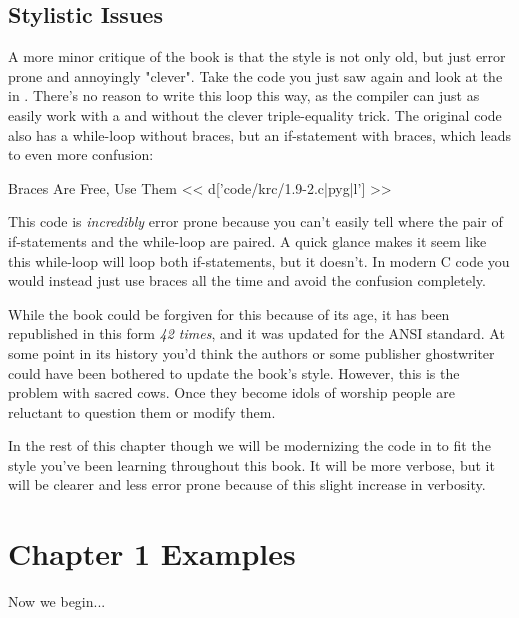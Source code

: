 \subsection{Stylistic Issues}

A more minor critique of the book is that the style is not only old, but just
error prone and annoyingly "clever".  Take the code you just saw again and look
at the  in .  There's no reason to write this
loop this way, as the compiler can just as easily work with a 
and without the clever triple-equality trick.  The original code also
has a while-loop without braces, but an if-statement with braces, which
leads to even more confusion:

\begin{code}{Braces Are Free, Use Them}
<< d['code/krc/1.9-2.c|pyg|l'] >>
\end{code}

This code is \emph{incredibly} error prone because you can't easily tell
where the pair of if-statements and the while-loop are paired.  A quick
glance makes it seem like this while-loop will loop both if-statements,
but it doesn't.  In modern C code you would instead just use braces all
the time and avoid the confusion completely.

While the book could be forgiven for this because of its age, it has been
republished in this form \emph{42 times}, and it was updated for the ANSI
standard.  At some point in its history you'd think the authors or some
publisher ghostwriter could have been bothered to update the book's style.
However, this is the problem with sacred cows.  Once they become idols of
worship people are reluctant to question them or modify them.

In the rest of this chapter though we will be modernizing the code in \krc
to fit the style you've been learning throughout this book.  It will be
more verbose, but it will be clearer and less error prone because of
this slight increase in verbosity.


\section{Chapter 1 Examples}

Now we begin...
